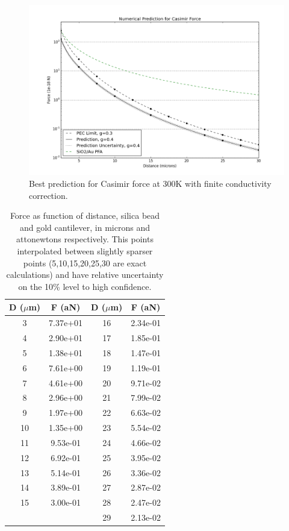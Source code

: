 \documentclass[11pt,traditabstract]{article}
\begin{document}
\begin{figure}[h]
\centering
\includegraphics[width=7in]{prediction}
\caption{Best prediction for Casimir force at 300K with finite conductivity correction.}\label{fig:prediction}
\end{figure}

\begin{table}[h]
\centering
\begin{tabular}{c | c || c | c}
D ($\mu$m) & F (aN) &D ($\mu$m) & F (aN) \\
\hline
   3 & 7.37e+01 &  16 & 2.34e-01 \\
   4 & 2.90e+01 & 17 & 1.85e-01 \\
   5 & 1.38e+01 &  18 & 1.47e-01 \\
   6 & 7.61e+00 &  19 & 1.19e-01 \\
   7 & 4.61e+00 & 20 & 9.71e-02 \\
   8 & 2.96e+00 &  21 & 7.99e-02 \\
   9 & 1.97e+00 &  22 & 6.63e-02 \\
  10 & 1.35e+00 &  23 & 5.54e-02 \\
  11 & 9.53e-01 & 24 & 4.66e-02 \\
  12 & 6.92e-01 &  25 & 3.95e-02 \\
  13 & 5.14e-01 &  26 & 3.36e-02 \\
  14 & 3.89e-01 & 27 & 2.87e-02 \\
  15 & 3.00e-01 & 28 & 2.47e-02 \\
   & & 29 & 2.13e-02 \\
   \hline
\end{tabular}
\caption{Force as function of distance, silica bead and gold cantilever, in microns and attonewtons respectively. This points interpolated between slightly sparser points (5,10,15,20,25,30 are exact calculations) and have relative uncertainty on the 10\% level to high confidence.}
\end{table}
\end{document}
